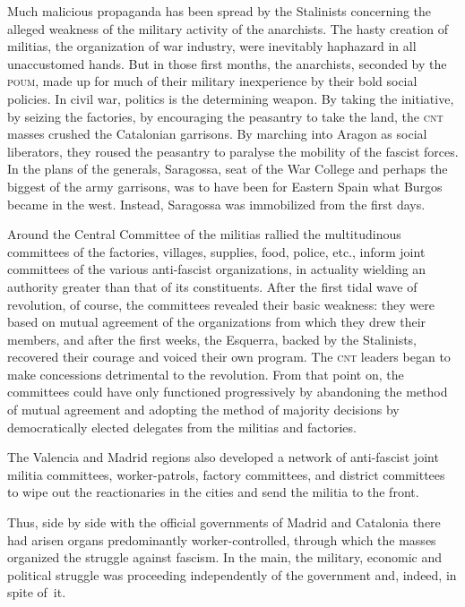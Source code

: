 Much malicious propaganda has been spread by the Stalinists concerning the alleged weakness of the military activity of the anarchists. The hasty creation of militias, the organization of war industry, were inevitably haphazard in all unaccustomed hands. But in those first months, the anarchists, seconded by the \textsc{poum}, made up for much of their military inexperience by their bold social policies. In civil war, politics is the determining weapon. By taking the initiative, by seizing the factories, by encouraging the peasantry to take the land, the \textsc{cnt} masses crushed the Catalonian garrisons. By marching into Aragon as social liberators, they roused the peasantry to paralyse the mobility of the fascist forces. In the plans of the generals, Saragossa, seat of the War College and perhaps the biggest of the army garrisons, was to have been for Eastern Spain what Burgos became in the west. Instead, Saragossa was immobilized from the first days.

Around the Central Committee of the militias rallied the multitudinous committees of the factories, villages, supplies, food, police, etc., inform joint committees of the various anti-fascist organizations, in actuality wielding an authority greater than that of its constituents. After the first tidal wave of revolution, of course, the committees revealed their basic weakness: they were based on mutual agreement of the organizations from which they drew their members, and after the first weeks, the Esquerra, backed by the Stalinists, recovered their courage and voiced their own program. The \textsc{cnt} leaders began to make concessions detrimental to the revolution. From that point on, the committees could have only functioned progressively by abandoning the method of mutual agreement and adopting the method of majority decisions by democratically elected delegates from the militias and factories.

The Valencia and Madrid regions also developed a network of anti-fascist joint militia committees, worker-patrols, factory committees, and district committees to wipe out the reactionaries in the cities and send the militia to the front.
\nowidow

Thus, side by side with the official governments of Madrid and Catalonia there had arisen organs predominantly worker-controlled, through which the masses organized the struggle against fascism. In the main, the military, economic and political struggle was proceeding independently of the government and, indeed, in spite of~it.

